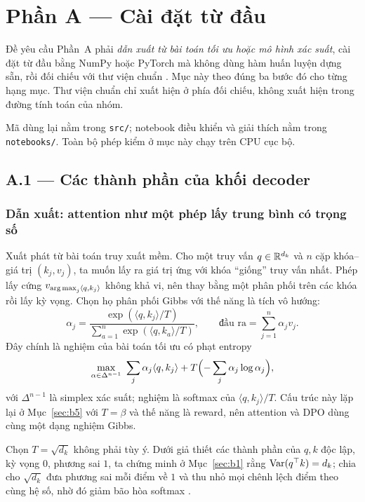 \section{Phần A --- Cài đặt từ đầu}
\label{sec:phan-a}

Đề yêu cầu Phần~A phải \emph{dẫn xuất từ bài toán tối ưu hoặc mô hình xác suất},
cài đặt từ đầu bằng NumPy hoặc PyTorch mà không dùng hàm huấn luyện dựng sẵn, rồi
đối chiếu với thư viện chuẩn \cite[tr.~1, mục I]{de}. Mục này theo đúng ba bước đó
cho từng hạng mục. Thư viện chuẩn chỉ xuất hiện ở phía đối chiếu, không xuất hiện
trong đường tính toán của nhóm.

Mã dùng lại nằm trong \texttt{src/}; notebook điều khiển và giải thích nằm trong
\texttt{notebooks/}. Toàn bộ phép kiểm ở mục này chạy trên CPU cục bộ.

\subsection{A.1 --- Các thành phần của khối decoder}
\label{sec:a1}

\subsubsection{Dẫn xuất: attention như một phép lấy trung bình có trọng số}

Xuất phát từ bài toán truy xuất mềm. Cho một truy vấn $q\in\mathbb{R}^{d_k}$ và $n$ cặp
khóa--giá trị $(k_j,v_j)$, ta muốn lấy ra giá trị ứng với khóa ``giống'' truy vấn
nhất. Phép lấy cứng $v_{\operatorname*{arg\,max}_j\langle q,k_j\rangle}$ không khả vi, nên thay bằng
một phân phối trên các khóa rồi lấy kỳ vọng. Chọn họ phân phối Gibbs với thế năng
là tích vô hướng:
\[
  \alpha_j=\frac{\exp(\langle q,k_j\rangle/T)}{\sum_{a=1}^{n}\exp(\langle q,k_a\rangle/T)},
  \qquad \text{đầu ra} = \sum_{j=1}^{n}\alpha_j v_j .
\]
Đây chính là nghiệm của bài toán tối ưu có phạt entropy
\[
  \max_{\alpha\in\Delta^{n-1}}\ \sum_j \alpha_j\langle q,k_j\rangle
    + T\Bigl(-\sum_j\alpha_j\log\alpha_j\Bigr),
\]
với $\Delta^{n-1}$ là simplex xác suất; nghiệm là softmax của $\langle q,k_j\rangle/T$.
Cấu trúc này lặp lại ở Mục~\ref{sec:b5} với $T=\beta$ và thế năng là reward, nên
attention và DPO dùng cùng một dạng nghiệm Gibbs.

Chọn $T=\sqrt{d_k}$ không phải tùy ý. Dưới giả thiết các thành phần của $q,k$ độc
lập, kỳ vọng $0$, phương sai $1$, ta chứng minh ở Mục~\ref{sec:b1} rằng
$\operatorname{Var}(q^\top k)=d_k$; chia cho $\sqrt{d_k}$ đưa phương sai mỗi điểm về $1$ và thu
nhỏ mọi chênh lệch điểm theo cùng hệ số, nhờ đó giảm bão hòa softmax
\cite[§3.2.1]{attention}.

